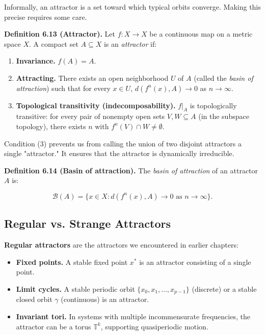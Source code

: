 Informally, an attractor is a set toward which typical orbits converge. Making this precise requires some care.

\textbf{Definition 6.13 (Attractor).} Let $f: X \to X$ be a continuous map on a metric space $X$. A compact set $A \subseteq X$ is an \textit{attractor} if:

\begin{enumerate}[nosep]
  \item \textbf{Invariance.} $f(A) = A$.
  \item \textbf{Attracting.} There exists an open neighborhood $U$ of $A$ (called the \textit{basin of attraction}) such that for every $x \in U$, $d(f^n(x), A) \to 0$ as $n \to \infty$.
  \item \textbf{Topological transitivity (indecomposability).} $f|_A$ is topologically transitive: for every pair of nonempty open sets $V, W \subseteq A$ (in the subspace topology), there exists $n$ with $f^n(V) \cap W \neq \emptyset$.
\end{enumerate}

Condition (3) prevents us from calling the union of two disjoint attractors a single "attractor." It ensures that the attractor is dynamically irreducible.

\textbf{Definition 6.14 (Basin of attraction).} The \textit{basin of attraction} of an attractor $A$ is:

\[
\mathcal{B}(A) = \{x \in X : d(f^n(x), A) \to 0 \text{ as } n \to \infty\}.
\]

\subsection{Regular vs. Strange Attractors}\label{sec:6.4.2}

\textbf{Regular attractors} are the attractors we encountered in earlier chapters:

\begin{itemize}[nosep]
  \item \textbf{Fixed points.} A stable fixed point $x^*$ is an attractor consisting of a single point.
  \item \textbf{Limit cycles.} A stable periodic orbit $\{x_0, x_1, \ldots, x_{p-1}\}$ (discrete) or a stable closed orbit $\gamma$ (continuous) is an attractor.
  \item \textbf{Invariant tori.} In systems with multiple incommensurate frequencies, the attractor can be a torus $\mathbb{T}^k$, supporting quasiperiodic motion.
\end{itemize}

